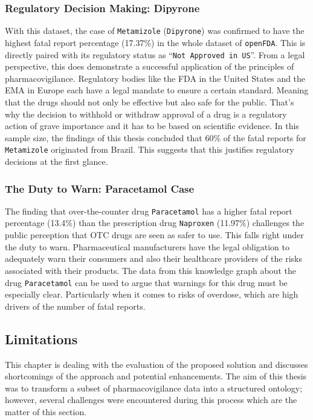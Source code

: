 \subsubsection*{Regulatory Decision Making: Dipyrone}
With this dataset, the case of \texttt{Metamizole} (\texttt{Dipyrone}) was confirmed to have the highest fatal report percentage (17.37\%) in the whole dataset of \texttt{openFDA}. This is directly paired with its regulatory status as ``\texttt{Not Approved in US}''. From a legal perspective, this does demonstrate a successful application of the principles of pharmacovigilance. Regulatory bodies like the FDA in the United States and the EMA in Europe each have a legal mandate to ensure a certain standard. Meaning that the drugs should not only be effective but also safe for the public. That's why the decision to withhold or withdraw approval of a drug is a regulatory action of grave importance and it has to be based on scientific evidence. In this sample size, the findings of this thesis concluded that 60\% of the fatal reports for \texttt{Metamizole} originated from Brazil. This suggests that this justifies regulatory decisions at the first glance.
\subsubsection*{The Duty to Warn: Paracetamol Case}
The finding that over-the-counter drug \texttt{Paracetamol} has a higher fatal report percentage (13.4\%) than the prescription drug \texttt{Naproxen} (11.97\%) challenges the public perception that OTC drugs are seen as safer to use.
This falls right under the duty to warn. Pharmaceutical manufacturers have the legal obligation to adequately warn their consumers and also their healthcare providers of the risks associated with their products. The data from this knowledge graph about the drug \texttt{Paracetamol} can be used to argue that warnings for this drug must be especially clear. Particularly when it comes to risks of overdose, which are high drivers of the number of fatal reports.
\subsection{Limitations}
This chapter is dealing with the evaluation of the proposed solution and discusses shortcomings of the approach and potential enhancements. The aim of this thesis was to transform a subset of pharmacovigilance data into a structured ontology; however, several challenges were encountered during this process which are the matter of this section.

